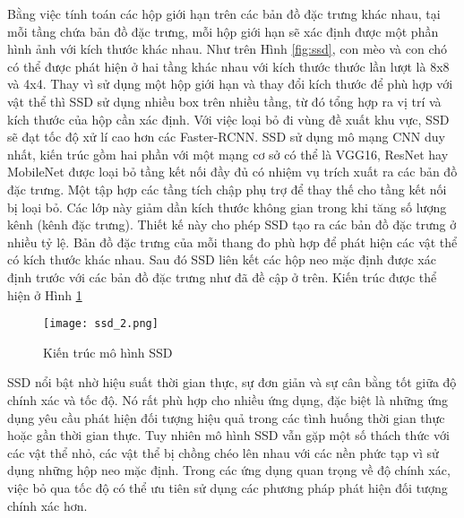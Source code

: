 \documentclass[../the.tex]{subfiles}
\begin{document}
{\fontsize{13}{12} \selectfont

Bằng việc tính toán các hộp giới hạn trên các bản đồ đặc trưng khác nhau, tại mỗi tầng chứa bản đồ đặc trưng, mỗi hộp giới hạn sẽ xác định được một phần hình ảnh với kích thước khác nhau. Như trên Hình \ref{fig:ssd}, con mèo và con chó có thể được phát hiện ở hai tầng khác nhau với kích thước thước lần lượt là 8x8 và 4x4. Thay vì sử dụng một hộp giới hạn và thay đổi kích thước để phù hợp với vật thể thì SSD sử dụng nhiều box trên nhiều tầng, từ đó tổng hợp ra vị trí và kích thước của hộp cần xác định. Với việc loại bỏ đi vùng đề xuất khu vực, SSD sẽ đạt tốc độ xử lí cao hơn các Faster-RCNN.
SSD sử dụng mô mạng CNN duy nhất, kiến trúc gồm hai phần với một mạng cơ sở có thể là VGG16, ResNet hay MobileNet được loại bỏ tầng kết nối đầy đủ có nhiệm vụ trích xuất ra các bản đồ đặc trưng.
Một tập hợp các tầng tích chập phụ trợ để thay thế cho tầng kết nối bị loại bỏ. Các lớp này giảm dần kích thước không gian trong khi tăng số lượng kênh (kênh đặc trưng). Thiết kế này cho phép SSD tạo ra các bản đồ đặc trưng ở nhiều tỷ lệ. Bản đồ đặc trưng của mỗi thang đo phù hợp để phát hiện các vật thể có kích thước khác nhau.
Sau đó SSD liên kết các hộp neo mặc định được xác định trước với các bản đồ đặc trưng như đã đề cập ở trên.
Kiến trúc được thể hiện ở Hình \ref{fig:ssd2}

}

\begin{figure}[H]
	\centering
	\texttt{[image: ssd\_2.png]}
	\caption{Kiến trúc mô hình SSD \cite{Liu_2016}}
	\label{fig:ssd2}
\end{figure}

{\fontsize{13}{12} \selectfont

SSD nổi bật nhờ hiệu suất thời gian thực, sự đơn giản và sự cân bằng tốt giữa độ chính xác và tốc độ. Nó rất phù hợp cho nhiều ứng dụng, đặc biệt là những ứng dụng yêu cầu phát hiện đối tượng hiệu quả trong các tình huống thời gian thực hoặc gần thời gian thực.
Tuy nhiên mô hình SSD vẫn gặp một số thách thức với các vật thể nhỏ, các vật thể bị chồng chéo lên nhau với các nền phức tạp vì sử dụng những hộp neo mặc định.
Trong các ứng dụng quan trọng về độ chính xác, việc bỏ qua tốc độ có thể ưu tiên sử dụng các phương pháp phát hiện đối tượng chính xác hơn.

}
\end{document}
